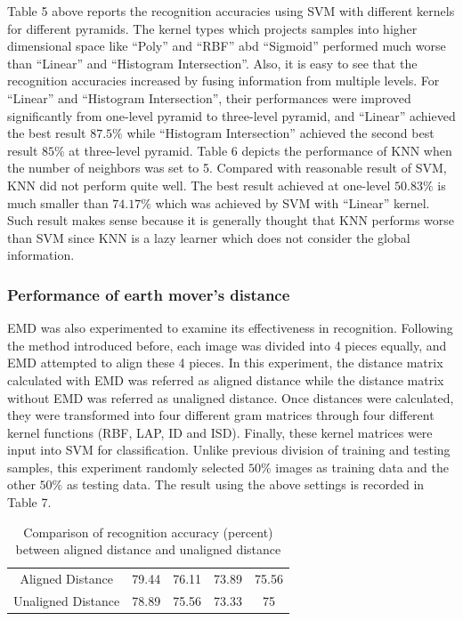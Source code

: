 \noindent Table 5 above reports the recognition accuracies using SVM with different kernels for different pyramids. The kernel types which projects samples into higher dimensional space like ``Poly'' and ``RBF'' abd ``Sigmoid'' performed much worse than ``Linear'' and ``Histogram Intersection''. Also, it is easy to see that the recognition accuracies increased by fusing information from multiple levels. For ``Linear'' and ``Histogram Intersection'', their performances were improved significantly from one-level pyramid to three-level pyramid, and ``Linear'' achieved the best result $87.5 \%$ while ``Histogram Intersection'' achieved the second best result $85 \%$ at three-level pyramid. Table 6 depicts the performance of KNN when the number of neighbors was set to 5. Compared with reasonable result of SVM, KNN did not perform quite well. The best result achieved at one-level $50.83\%$ is much smaller than $74.17\%$ which was achieved by SVM with ``Linear'' kernel. Such result makes sense because it is generally thought that KNN performs worse than SVM since KNN is a lazy learner which does not consider the global information. 

\subsubsection{Performance of earth mover's distance}
EMD was also experimented to examine its effectiveness in recognition. Following the method introduced before, each image was divided into 4 pieces equally, and EMD attempted to align these 4 pieces. In this experiment, the distance matrix calculated with EMD was referred as aligned distance while the distance matrix without EMD was referred as unaligned distance. Once distances were calculated, they were transformed into four different gram matrices through four different kernel functions (RBF, LAP, ID and ISD). Finally, these kernel matrices were input into SVM for classification. Unlike previous division of training and testing samples, this experiment randomly selected $50\%$ images as training data and the other $50\%$ as testing data. The result using the above settings is recorded in Table 7. 

\begin{table}[!ht]
	\begin{center}

	  \begin{tabular} {ccccc}
	  \hline
		\head{} & \head{RBF} & \head{LAP} & \head{ID} & \head{ISD}\\
	  \hline
      Aligned Distance & 79.44 & 76.11 & 73.89 & 75.56 \\
      Unaligned Distance & 78.89 & 75.56 & 73.33 & 75 \\
      \hline
      \end{tabular}
    \end{center}

    \caption{Comparison of recognition accuracy (percent) between aligned distance and unaligned distance}
\end{table}

